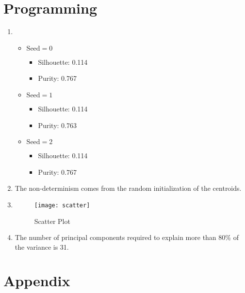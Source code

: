 \documentclass[12pt,a4paper]{article}
\newcommand{\silhouettezero} {0.114}
\newcommand{\purityzero} {0.767}
\newcommand{\silhouetteone} {0.114}
\newcommand{\purityone} {0.763}
\newcommand{\silhouettetwo} {0.114}
\newcommand{\puritytwo} {0.767}
\begin{document}
\section{Programming}
\begin{enumerate}
	\item \begin{itemize}
		      \item $\mathrm{Seed} = 0$
		            \begin{itemize}
			            \item Silhouette: \silhouettezero
			            \item Purity: \purityzero
		            \end{itemize}
		      \item $\mathrm{Seed} = 1$
		            \begin{itemize}
			            \item Silhouette: \silhouetteone
			            \item Purity: \purityone
		            \end{itemize}
		      \item $\mathrm{Seed} = 2$
		            \begin{itemize}
			            \item Silhouette: \silhouettetwo
			            \item Purity: \puritytwo
		            \end{itemize}
	      \end{itemize}

	\item The non-determinism comes from the random initialization of the centroids.

	\item \mbox{}
	      \begin{figure}[h]
		      \centering
		      \texttt{[image: scatter]}
		      \caption{Scatter Plot}
	      \end{figure}

	\item The number of principal components required to explain more than 80\% of
	      the variance is 31.
\end{enumerate}
\pagebreak

\section{Appendix}

\end{document}
